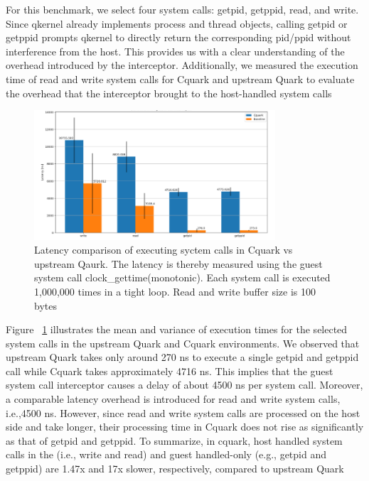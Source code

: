 For this benchmark, we select four system calls: getpid, getppid, read, and write. Since qkernel already implements process and thread objects, calling getpid or getppid prompts qkernel to directly return the corresponding pid/ppid without interference from the host. This provides us with a clear understanding of the overhead introduced by the interceptor. Additionally, we measured the execution time of read and write system calls for Cquark and upstream Quark to evaluate the overhead that the interceptor brought to the host-handled system calls
\begin{figure}[H]
    \centering
    \includegraphics[width=0.8\textwidth]{images/ben_results_syscall_interceptor.PNG}
    \caption[Benchmark result of Syscall Interceptor]{Latency comparison of executing syctem calls in Cquark vs upstream Qaurk. The latency is thereby measured using the guest system call clock\_gettime(monotonic). 
        Each system call is executed 1,000,000 times in a tight loop. Read and write buffer size is 100 bytes}
    \label{fig:ben_results_syscall_interceptor}
\end{figure}


Figure ~\ref{fig:ben_results_syscall_interceptor} illustrates the mean and variance of execution times for the selected system calls in the upstream Quark and Cquark environments. We observed that upstream Quark takes only around 270 ns to execute a single getpid and getppid call while Cquark takes approximately 4716 ns. This implies that the guest system call interceptor causes a delay of about 4500 ns per system call. Moreover, a comparable latency overhead is introduced for read and write system calls, i.e.,4500 ns.  However, since read and write system calls are processed on the host side and take longer, their processing time in Cquark does not rise as significantly as that of getpid and getppid. To summarize, in cquark, host handled system calls in the (i.e., write and read) and guest handled-only (e.g., getpid and getppid) are 1.47x and 17x slower, respectively, compared to upstream Quark


